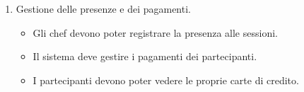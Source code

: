 \begin{enumerate}
    \item Gestione delle presenze e dei pagamenti.
    \begin{itemize}
        \item Gli chef devono poter registrare la presenza alle sessioni.
        \item Il sistema deve gestire i pagamenti dei partecipanti.
        \item I partecipanti devono poter vedere le proprie carte di credito.
    \end{itemize}
\end{enumerate}


